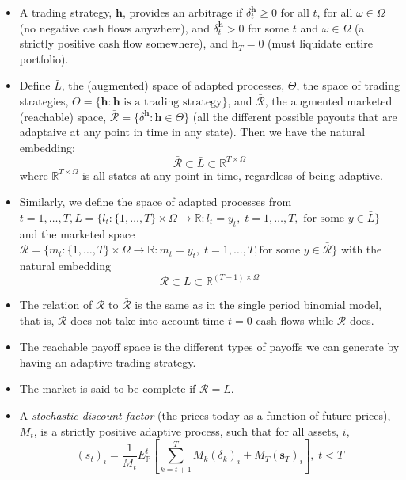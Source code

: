 \documentclass[11pt]{article}
\begin{document}
\begin{itemize}
    \item A trading strategy, $\boldsymbol{h}$, provides an arbitrage if $\delta_t^
    {\boldsymbol{h}} \ge 0$ for all $t$, for all $\omega \in \Omega$ (no negative cash flows 
    anywhere), and $\delta_t^{\boldsymbol{h}} > 0$ for some $t$ and $\omega \in \Omega$ (a 
    strictly positive cash flow somewhere), and $\boldsymbol{h}_T = 0$ (must liquidate entire 
    portfolio).
    
    \item Define $\bar{L}$, the (augmented) space of 
    adapted processes, $\Theta$, the space of trading strategies, $\Theta = \{\boldsymbol{h}:
    \boldsymbol{h} \text{ is a trading strategy}\}$, and $\mathcal{\bar{R}}$, the augmented 
    marketed (reachable) space, $\mathcal{\bar{R}} = \{\delta^{\boldsymbol{h}} : 
    \boldsymbol{h} \in \Theta\}$ (all the different possible payouts that are adaptaive at any 
    point in time in any state). Then we have the natural embedding:
    \[\mathcal{\bar{R}} \subset \bar{L} \subset \mathbb{R}^{T \times \Omega} \]
    where $\mathbb{R}^{T \times \Omega}$ is all states at any point in time, regardless of
    being adaptive. 
    
    \item Similarly, we define the space of adapted processes from $t=1, \ldots, T, L = \{l_t :
    \{1, \ldots, T\} \times \Omega \rightarrow \mathbb{R} : l_t = y_t, \; t = 1, \ldots, T, 
    \text{ for some } y \in \bar{L}\}$ and the marketed space $\mathcal{R} = \{m_t : \{1, 
    \ldots, T\} \times \Omega \rightarrow \mathbb{R} : m_t = y_t, \; t = 1, \ldots, T, \text{
    for some } y \in \mathcal{\bar{R}}\}$ with the natural embedding 
    \[\mathcal{R} \subset L \subset \mathbb{R}^{(T-1) \times \Omega}\]
    
    \item The relation of $\mathcal{R}$ to $\mathcal{\bar{R}}$ is the same as in the single 
    period binomial model, that is, $\mathcal{R}$ does not take into account time $t=0$ cash 
    flows while $\mathcal{\bar{R}}$ does. 

    \item The reachable payoff space is the different types of payoffs we can generate by 
    having an adaptive trading strategy. 

    \item The market is said to be complete if $\mathcal{R} = L$.
    
    \item A \textit{stochastic discount factor} (the prices today as a function of future 
    prices), $M_t$, is a strictly positive adaptive process, such that for all assets, $i$, 
    \[ 
    {(s_t)}_i = \frac{1}{M_t} E_{\mathbb{P}}^t \left[ \sum_{k=t+1}^{T} M_k {(\delta_k)}_i + 
    M_T {(\boldsymbol{s}_T)}_i\right], \; t < T \]
    

\end{itemize}
\end{document}
